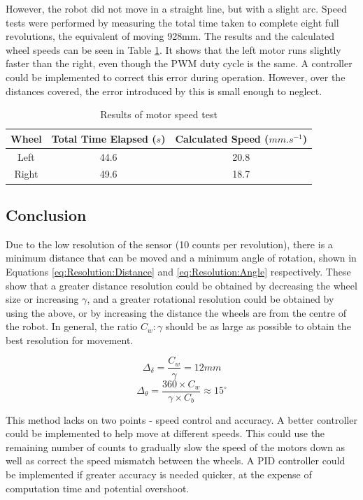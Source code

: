 However, the robot did not move in a straight line, but with a slight arc. Speed tests were performed by measuring the total time taken to complete eight full revolutions, the equivalent of moving 928mm. The results and the calculated wheel speeds can be seen in Table \ref{table:results:motor:speed}. It shows that the left motor runs slightly faster than the right, even though the PWM duty cycle is the same. A controller could be implemented to correct this error during operation. However, over the distances covered, the error introduced by this is small enough to neglect. 

\begin{table}
\caption{Results of motor speed test}
\label{table:results:motor:speed}
\centering
\begin{tabular}{ccc} \toprule
\textbf{Wheel} &	\textbf{Total Time Elapsed ($s$)} & \textbf{Calculated Speed ($mm.s^{-1}$)} \\ \toprule
Left & 44.6		&	20.8 \\ \midrule
Right & 49.6	&	18.7 \\ \bottomrule
\end{tabular}
\end{table}

\subsection{Conclusion}
Due to the low resolution of the sensor (10 counts per revolution), there is a minimum distance that can be moved and a minimum angle of rotation, shown in Equations \eqref{eq:Resolution:Distance} and \eqref{eq:Resolution:Angle} respectively. These show that a greater distance resolution could be obtained by decreasing the wheel size or increasing $\gamma$, and a greater rotational resolution could be obtained by using the above, or by increasing the distance the wheels are from the centre of the robot. In general, the ratio $C_w:\gamma$ should be as large as possible to obtain the best resolution for movement.


\begin{equation}\label{eq:Resolution:Distance}
\Delta_{\delta} = \frac{C_w}{\gamma} = 12mm
\end{equation}
\begin{equation}\label{eq:Resolution:Angle}
\Delta_{\theta} = \frac{360 \times C_w}{\gamma \times C_b} \approx 15^\circ 
\end{equation}

This method lacks on two points - speed control and accuracy.
A better controller could be implemented to help move at different speeds. This could use the remaining number of counts to gradually slow the speed of the motors down as well as correct the speed mismatch between the wheels. A PID controller could be implemented if greater accuracy is needed quicker, at the expense of computation time and potential overshoot. 

